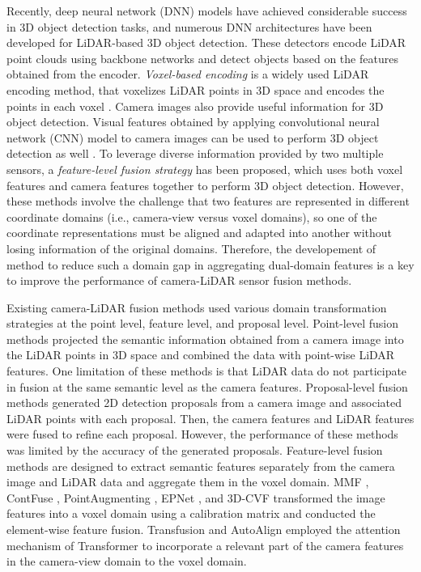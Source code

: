 \documentclass[lettersize,journal]{IEEEtran}
\begin{document}
Recently, deep neural network (DNN) models have achieved considerable success in 3D object detection tasks, and numerous DNN architectures have been developed for LiDAR-based 3D object detection. These detectors encode LiDAR point clouds using   backbone networks and detect objects based on the features obtained from the encoder. {\it Voxel-based encoding} is a widely used LiDAR encoding method, that voxelizes LiDAR points in 3D space and encodes the points in each voxel \cite{voxelnet, second}. Camera images also provide useful information for 3D object detection. Visual features obtained by applying convolutional neural network (CNN) model to camera images can be used to perform 3D object detection as well \cite{bevformer}. To leverage diverse information provided by two multiple sensors, a {\it feature-level fusion strategy} has been proposed, which uses both voxel features and camera features together to perform 3D object detection.  However, these methods involve the challenge that two features are represented in different coordinate domains (i.e., camera-view versus voxel domains), so one of the coordinate representations must be aligned and adapted into another without losing information of the original domains. Therefore, the developement of method to reduce such a domain gap in aggregating  dual-domain features is a  key to improve the performance of camera-LiDAR sensor fusion methods. 


Existing camera-LiDAR fusion methods used various domain transformation strategies at the point level, feature level, and proposal level. Point-level fusion methods \cite{mvxnet, vora2020pointpainting, ipod} projected the semantic information obtained from a camera image into the LiDAR points in 3D space and combined the data with point-wise LiDAR features. One limitation of these methods is that LiDAR data do not participate in fusion at the same semantic level as the camera features. Proposal-level fusion methods \cite{pointfusion, fpointnet, ipod} generated 2D detection proposals from a camera image and associated LiDAR points with each proposal. Then, the camera features and LiDAR features were fused to refine each proposal. However, the performance of these methods was limited by the accuracy of the generated proposals. Feature-level fusion methods \cite{mmf, contfuse, pointaugmenting, epnet, 3d-cvf,transfusion, autoalign} are designed to extract semantic features separately from the camera image and LiDAR data and aggregate them in the voxel domain. MMF \cite{mmf}, ContFuse \cite{contfuse}, PointAugmenting \cite{pointaugmenting}, EPNet \cite{epnet}, and 3D-CVF \cite{3d-cvf} transformed the image features into a voxel domain using a calibration matrix and conducted the element-wise feature fusion.  Transfusion  \cite{transfusion} and AutoAlign \cite{autoalign} employed the attention mechanism of Transformer to incorporate a relevant part of the camera features in the camera-view domain to the voxel domain.
\end{document}
